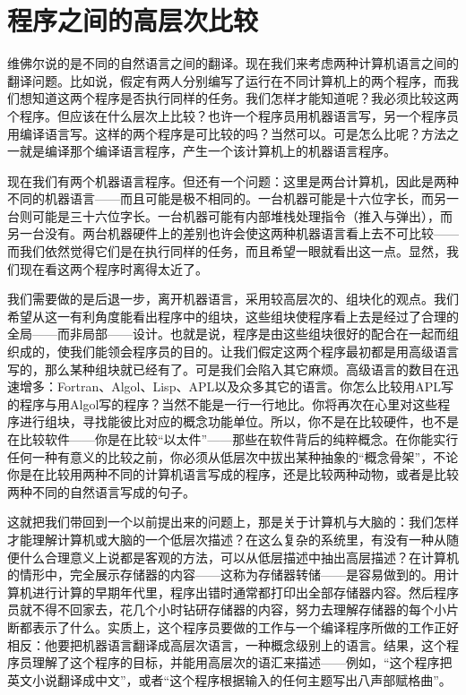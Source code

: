 \section{程序之间的高层次比较}

维佛尔说的是不同的自然语言之间的翻译。现在我们来考虑两种计算机语言之间的翻译问题。比如说，假定有两人分别编写了运行在不同计算机上的两个程序，而我们想知道这两个程序是否执行同样的任务。我们怎样才能知道呢？我必须比较这两个程序。但应该在什么层次上比较？也许一个程序员用机器语言写，另一个程序员用编译语言写。这样的两个程序是可比较的吗？当然可以。可是怎么比呢？方法之一就是编译那个编译语言程序，产生一个该计算机上的机器语言程序。

现在我们有两个机器语言程序。但还有一个问题：这里是两台计算机，因此是两种不同的机器语言——而且可能是极不相同的。一台机器可能是十六位字长，而另一台则可能是三十六位字长。一台机器可能有内部堆栈处理指令（推入与弹出），而另一台没有。两台机器硬件上的差别也许会使这两种机器语言看上去不可比较——而我们依然觉得它们是在执行同样的任务，而且希望一眼就看出这一点。显然，我们现在看这两个程序时离得太近了。

我们需要做的是后退一步，离开机器语言，采用较高层次的、组块化的观点。我们希望从这一有利角度能看出程序中的组块，这些组块使程序看上去是经过了合理的全局——而非局部——设计。也就是说，程序是由这些组块很好的配合在一起而组织成的，使我们能领会程序员的目的。让我们假定这两个程序最初都是用高级语言写的，那么某种组块就已经有了。可是我们会陷入其它麻烦。高级语言的数目在迅速增多：Fortran、Algol、Lisp、APL以及众多其它的语言。你怎么比较用APL写的程序与用Algol写的程序？当然不能是一行一行地比。你将再次在心里对这些程序进行组块，寻找能彼比对应的概念功能单位。所以，你不是在比较硬件，也不是在比较软件——你是在比较“以太件”——那些在软件背后的纯粹概念。在你能实行任何一种有意义的比较之前，你必须从低层次中拔出某种抽象的“概念骨架”，不论你是在比较用两种不同的计算机语言写成的程序，还是比较两种动物，或者是比较两种不同的自然语言写成的句子。

这就把我们带回到一个以前提出来的问题上，那是关于计算机与大脑的：我们怎样才能理解计算机或大脑的一个低层次描述？在这么复杂的系统里，有没有一种从随便什么合理意义上说都是客观的方法，可以从低层描述中抽出高层描述？在计算机的情形中，完全展示存储器的内容——这称为存储器转储——是容易做到的。用计算机进行计算的早期年代里，程序出错时通常都打印出全部存储器内容。然后程序员就不得不回家去，花几个小时钻研存储器的内容，努力去理解存储器的每个小片断都表示了什么。实质上，这个程序员要做的工作与一个编译程序所做的工作正好相反：他要把机器语言翻译成高层次语言，一种概念级别上的语言。结果，这个程序员理解了这个程序的目标，并能用高层次的语汇来描述——例如，“这个程序把英文小说翻译成中文”，或者“这个程序根据输入的任何主题写出八声部赋格曲”。


